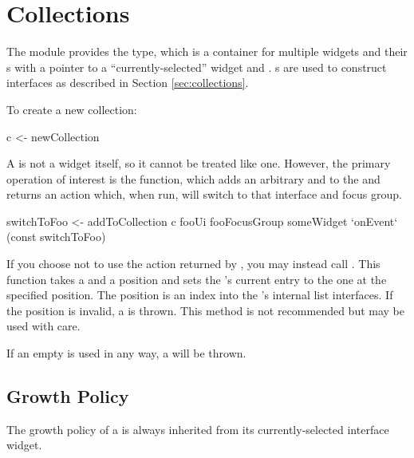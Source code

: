 \section{Collections}

The  module provides the  type, which
is a container for multiple widgets and their s with a
pointer to a ``currently-selected'' widget and .
s are used to construct interfaces as described in
Section \ref{sec:collections}.

To create a new collection:

\begin{haskellcode}
 c <- newCollection
\end{haskellcode}

A  is not a widget itself, so it cannot be treated like
one.  However, the primary operation of interest is the
 function, which adds an arbitrary 
and  to the  and returns an 
action which, when run, will switch to that interface and focus group.

\begin{haskellcode}
 switchToFoo <- addToCollection c fooUi fooFocusGroup
 someWidget `onEvent` (const switchToFoo)
\end{haskellcode}

If you choose not to use the  action returned by
, you may instead call .  This
function takes a  and a position and sets the
's current entry to the one at the specified position.
The position is an index into the 's internal list
interfaces.  If the position is invalid, a  is
thrown.  This method is not recommended but may be used with care.


If an empty  is used in any way, a 
will be thrown.

\subsection{Growth Policy}

The growth policy of a  is always inherited from its
currently-selected interface widget.
